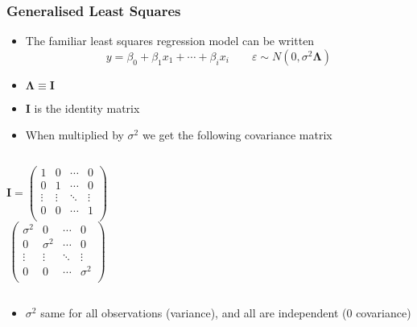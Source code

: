 \documentclass{beamer}
\begin{document}
\begin{frame}
    \frametitle{Generalised Least Squares}
    \begin{itemize}
        \item The familiar least squares regression model can be written
        $$y = \beta_0 + \beta_1x_1 + \cdots + \beta_ix_i \qquad \varepsilon \sim N(0, \sigma^2 \mathbf{\Lambda})$$
        \item $\mathbf{\Lambda} \equiv \mathbf{I}$
        \item $\mathbf{I}$ is the identity matrix
        \item When multiplied by $\sigma^2$ we get the following covariance matrix
    \end{itemize}
    \begin{columns}
        \column{6cm}
        $$\mathbf{I} = \left( \begin{array}{cccc}
                     1        & 0        & \cdots & 0        \\
                     0        & 1        & \cdots & 0        \\
                     \vdots   & \vdots   & \ddots & \vdots   \\
                     0        & 0        & \cdots & 1        \\
                 \end{array} \right)$$
        \column{6cm}
        $$\left( \begin{array}{cccc}
                     \sigma^2 & 0        & \cdots & 0        \\
                     0        & \sigma^2 & \cdots & 0        \\
                     \vdots   & \vdots   & \ddots & \vdots   \\
                     0        & 0        & \cdots & \sigma^2 \\
                 \end{array} \right)$$
    \end{columns}
    \begin{itemize}
        \item $\sigma^2$ same for all observations (variance), and all are independent (0 covariance)
    \end{itemize}
\end{frame}
\end{document}
